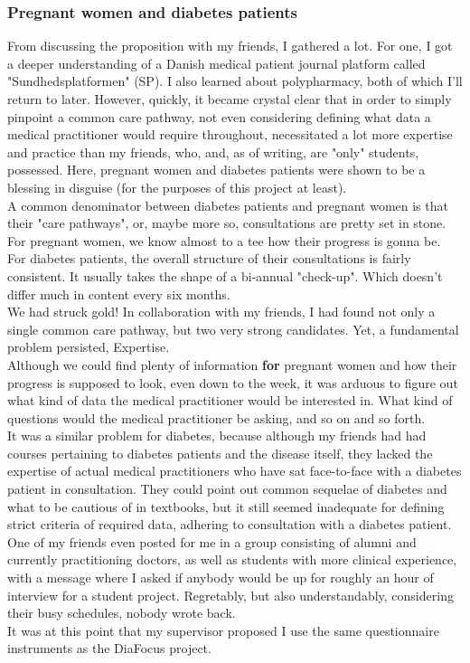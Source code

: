 \subsubsection*{Pregnant women and diabetes patients}
From discussing the proposition with my friends, I gathered a lot. For one, I got a deeper understanding of a Danish medical patient journal platform called "Sundhedsplatformen" (SP). I also learned about polypharmacy, both of which I'll return to later. However, quickly, it became crystal clear that in order to simply pinpoint a common care pathway, not even considering defining what data a medical practitioner would require throughout, necessitated a lot more expertise and practice than my friends, who, and, as of writing, are "only" students, possessed. Here, pregnant women and diabetes patients were shown to be a blessing in disguise (for the purposes of this project at least).
\\
A common denominator between diabetes patients and pregnant women is that their "care pathways", or, maybe more so, consultations are pretty set in stone. For pregnant women, we know almost to a tee how their progress is gonna be. For diabetes patients, the overall structure of their consultations is fairly consistent. It usually takes the shape of a bi-annual "check-up". Which doesn't differ much in content every six months.
\\
We had struck gold! In collaboration with my friends, I had found not only a single common care pathway, but two very strong candidates. Yet, a fundamental problem persisted, Expertise.
\\
Although we could find plenty of information \textbf{for} pregnant women and how their progress is supposed to look, even down to the week, it was arduous to figure out what kind of data the medical practitioner would be interested in. What kind of questions would the medical practitioner be asking, and so on and so forth. 
\\
It was a similar problem for diabetes, because although my friends had had courses pertaining to diabetes patients and the disease itself, they lacked the expertise of actual medical practitioners who have sat face-to-face with a diabetes patient in consultation. They could point out common sequelae of diabetes and what to be cautious of in textbooks, but it still seemed inadequate for defining strict criteria of required data, adhering to consultation with a diabetes patient. 
\\
One of my friends even posted for me in a group consisting of alumni and currently practitioning doctors, as well as students with more clinical experience, with a message where I asked if anybody would be up for roughly an hour of interview for a student project. Regretably, but also understandably, considering their busy schedules, nobody wrote back.
\\
It was at this point that my supervisor proposed I use the same questionnaire instruments as the DiaFocus project.


